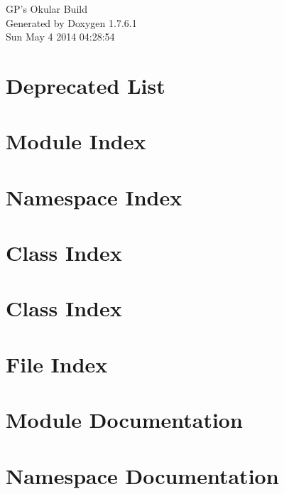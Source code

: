 \documentclass[a4paper]{book}
\begin{document}
\hypersetup{pageanchor=false,citecolor=blue}
\begin{titlepage}
\vspace*{7cm}
\begin{center}
{\Large \-G\-P's \-Okular \-Build }\\
\vspace*{1cm}
{\large \-Generated by Doxygen 1.7.6.1}\\
\vspace*{0.5cm}
{\small Sun May 4 2014 04:28:54}\\
\end{center}
\end{titlepage}
\clearemptydoublepage
{}
\tableofcontents
\clearemptydoublepage
{}
\hypersetup{pageanchor=true,citecolor=blue}
\chapter{\-Deprecated \-List}
\label{deprecated}
\hypertarget{deprecated}{}

\chapter{\-Module \-Index}

\chapter{\-Namespace \-Index}

\chapter{\-Class \-Index}

\chapter{\-Class \-Index}

\chapter{\-File \-Index}

\chapter{\-Module \-Documentation}

\chapter{\-Namespace \-Documentation}



\end{document}
